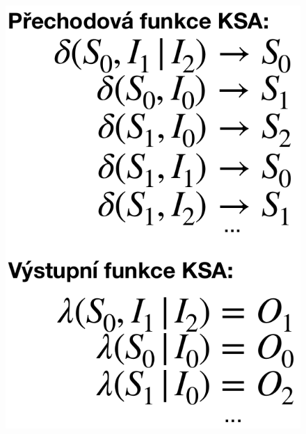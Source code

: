 \begin{figure}[h!]
\begin{minipage}[b]{0.4\textwidth}
        \includegraphics[width=\textwidth]{img/MealyRovnice.png}
    \end{minipage}
\end{figure}

